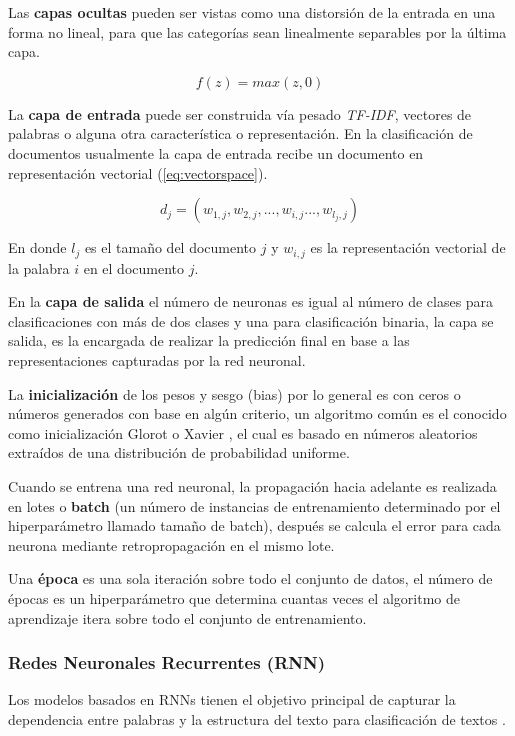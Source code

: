 Las\textbf{ capas ocultas} pueden ser vistas como una distorsión de la entrada en una forma no lineal, para que las categorías sean linealmente separables por la última capa.

\begin{equation} \label{eq:RELU}
    f(z)= max(z,0)
\end{equation}

La \textbf{capa de entrada} puede ser construida vía pesado \textit{TF-IDF}, vectores de palabras o alguna otra característica o representación. En la clasificación de documentos usualmente la capa de entrada recibe un documento en representación vectorial (\ref{eq:vectorspace}).

\begin{equation} \label{eq:vectorspace}
d_{j} = (w_{1,j},w_{2,j},...,w_{i,j}...,w_{l_{j},j})
\end{equation}

En donde $l_{j}$ es el tamaño del documento $j$ y $w_{i,j}$ es la representación vectorial de la palabra $i$ en el documento $j$.

En la \textbf{capa de salida} el número de neuronas es igual al número de clases para clasificaciones con más de dos clases y una para clasificación binaria, la capa se salida, es la encargada de realizar la predicción final en base a las representaciones capturadas por la red neuronal.

La \textbf{inicialización} de los pesos y sesgo (bias) por lo general es con ceros o números generados con base en algún criterio, un algoritmo común es el conocido como inicialización Glorot o Xavier \citep{glorot2010understanding}, el cual es basado en números aleatorios extraídos de una distribución de probabilidad uniforme.

Cuando se entrena una red neuronal, la propagación hacia adelante es realizada en lotes o \textbf{batch} (un número de instancias de entrenamiento determinado por el hiperparámetro llamado tamaño de batch), después se calcula el error para cada neurona mediante retropropagación en el mismo lote. 

Una \textbf{época} es una sola iteración sobre todo el conjunto de datos, el número de épocas es un hiperparámetro que determina cuantas veces el algoritmo de aprendizaje itera sobre todo el conjunto de entrenamiento.


\subsubsection{Redes Neuronales Recurrentes (RNN)}
Los modelos basados en RNNs tienen el objetivo principal de capturar la dependencia entre palabras y la estructura del texto para clasificación de textos \cite{goodfellow2016deep}.

